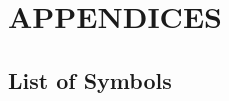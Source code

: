 
\appendix

\chapter*{APPENDICES}\label{chap:A}
\renewcommand{\thechapter}{A}
\setcounter{section}{0}
\renewcommand{\thesection}{\thechapter.\arabic{section}}
\setcounter{equation}{0}
\renewcommand{\theequation}{\thechapter.\arabic{equation}}
\setcounter{figure}{0}

\section{List of Symbols}\label{sec:A_1}

